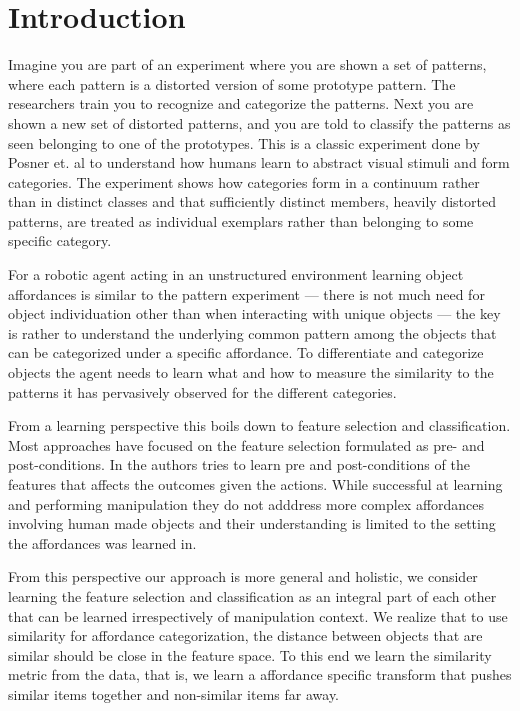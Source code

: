\section{Introduction}\label{introduction}

Imagine you are part of an experiment where you are shown a set of
patterns, where each pattern is a distorted version of some prototype
pattern. The researchers train you to recognize and categorize the
patterns. Next you are shown a new set of distorted patterns, and you
are told to classify the patterns as seen belonging to one of the
prototypes. This is a classic experiment done by Posner et. al
\cite{POSNER:1967ef} to understand how humans learn to abstract visual
stimuli and form categories. The experiment shows how categories form in
a continuum rather than in distinct classes and that sufficiently
distinct members, heavily distorted patterns, are treated as individual
exemplars rather than belonging to some specific category.

For a robotic agent acting in an unstructured environment learning
object affordances is similar to the pattern experiment --- there is not
much need for object individuation other than when interacting with
unique objects --- the key is rather to understand the underlying common
pattern among the objects that can be categorized under a specific
affordance. To differentiate and categorize objects the agent needs to
learn what and how to measure the similarity to the patterns it has
pervasively observed for the different categories.

From a learning perspective this boils down to feature selection and
classification. Most approaches have focused on the feature selection
formulated as pre- and post-conditions. In
\cite{Stoytchev:2005il, Chao:2011id, Niekum:us} the authors tries to
learn pre and post-conditions of the features that affects the outcomes
given the actions. While successful at learning and performing
manipulation they do not adddress more complex affordances involving
human made objects and their understanding is limited to the setting the
affordances was learned in.

From this perspective our approach is more general and holistic, we
consider learning the feature selection and classification as an
integral part of each other that can be learned irrespectively of
manipulation context. We realize that to use similarity for affordance
categorization, the distance between objects that are similar should be
close in the feature space. To this end we learn the similarity metric
from the data, that is, we learn a affordance specific transform that
pushes similar items together and non-similar items far away.

